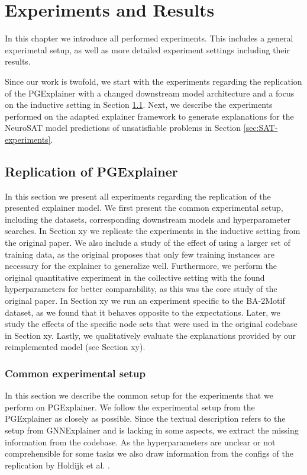 \chapter{Experiments and Results}
\label{ch:Experiments}

In this chapter we introduce all performed experiments. This includes a general experimetal setup, as well as more detailed experiment settings including their results.

Since our work is twofold, we start with the experiments regarding the replication of the PGExplainer with a changed downstream model architecture and a focus on the inductive setting in Section \ref{sec:experiments_replication}. Next, we describe the experiments performed on the adapted explainer framework to generate explanations for the NeuroSAT model predictions of unsatisfiable problems in Section \ref{sec:SAT-experiments}.

\section{Replication of PGExplainer}
\label{sec:experiments_replication}
In this section we present all experiments regarding the replication of the presented explainer model. We first present the common experimental setup, including the datasets, corresponding downstream models and hyperparameter searches. In Section xy we replicate the experiments in the inductive setting from the original paper. We also include a study of the effect of using a larger set of training data, as the original proposes that only few training instances are necessary for the explainer to generalize well. Furthermore, we perform the original quantitative experiment in the collective setting with the found hyperparameters for better comparability, as this was the core study of the original paper. In Section xy we run an experiment specific to the BA-2Motif dataset, as we found that it behaves opposite to the expectations. Later, we study the effects of the specific node sets that were used in the original codebase in Section xy. Lastly, we qualitatively evaluate the explanations provided by our reimplemented model (see Section xy).

\subsection{Common experimental setup}
In this section we describe the common setup for the experiments that we perform on PGExplainer.
We follow the experimental setup from the PGExplainer as closely as possible. Since the textual description refers to the setup from GNNExplainer and is lacking in some aspects, we extract the missing information from the codebase. As the hyperparameters are unclear or not comprehensible for some tasks we also draw information from the configs of the replication by Holdijk et al. \cite{holdijk2021re}. \\


